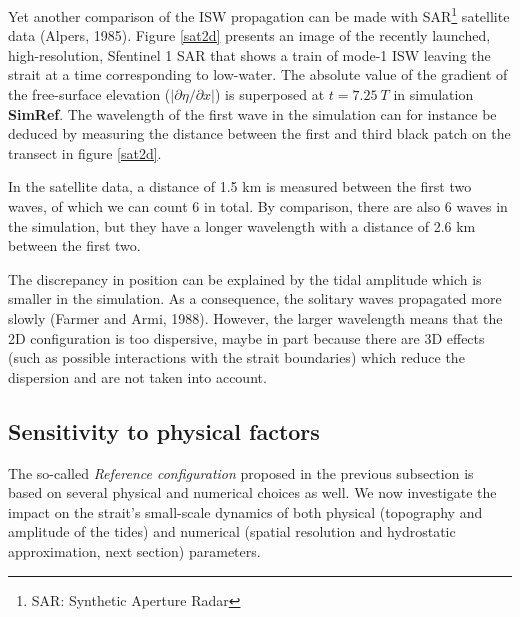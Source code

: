 Yet another comparison of the ISW propagation can be made with SAR\footnote{SAR: Synthetic Aperture Radar} satellite data (Alpers, 1985). Figure \ref{sat2d} presents an image of the recently launched, high-resolution, Sfentinel 1 SAR that shows a train of mode-1 ISW leaving the strait at a time corresponding to low-water. The absolute value of the gradient of the free-surface elevation ($\vert \partial \eta / \partial x \vert$) is superposed at $t = 7.25\ T$ in simulation \textbf{SimRef}. The wavelength of the first wave in the simulation can for instance be deduced by measuring the distance between the first and third black patch on the transect in figure \ref{sat2d}.\color{black}

In the satellite data, a distance of 1.5 km is measured between the first two waves, of which we can count 6 in total. By comparison, there are also 6 waves in the simulation, but they have a longer wavelength with a distance of 2.6 km between the first two.

The discrepancy in position can be explained by the tidal amplitude which is smaller in the simulation. As a consequence, the solitary waves propagated more slowly (Farmer and Armi, 1988). However, the larger wavelength means that the 2D configuration is too dispersive, maybe in part because there are 3D effects (such as possible interactions with the strait boundaries) which reduce the dispersion and are not taken into account.\\


\subsection{Sensitivity to physical factors}
The so-called \textit{Reference configuration} proposed in the previous subsection is based on several physical and numerical choices as well. We now investigate the impact on the strait's small-scale dynamics of both physical (topography and amplitude of the tides) and numerical (spatial resolution and hydrostatic approximation, next section) parameters. 



